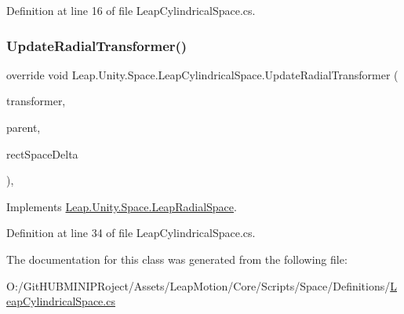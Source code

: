 Definition at line 16 of file Leap\+Cylindrical\+Space.\+cs.

\mbox{\label{class_leap_1_1_unity_1_1_space_1_1_leap_cylindrical_space_aaf93c86d6ae53e212049898f2bb2a2cf}} 
\subsubsection{\texorpdfstring{UpdateRadialTransformer()}{UpdateRadialTransformer()}}
{\footnotesize\ttfamily override void Leap.\+Unity.\+Space.\+Leap\+Cylindrical\+Space.\+Update\+Radial\+Transformer (\begin{DoxyParamCaption}\item[{\mbox{\hyperlink{interface_leap_1_1_unity_1_1_space_1_1_i_transformer}{I\+Transformer}}}]{transformer,  }\item[{\mbox{\hyperlink{interface_leap_1_1_unity_1_1_space_1_1_i_transformer}{I\+Transformer}}}]{parent,  }\item[{Vector3}]{rect\+Space\+Delta }\end{DoxyParamCaption})\hspace{0.3cm}{\ttfamily [protected]}, {\ttfamily [virtual]}}



Implements \mbox{\hyperlink{class_leap_1_1_unity_1_1_space_1_1_leap_radial_space_afc597bb7c75791b2f8807b3b810e8c69}{Leap.\+Unity.\+Space.\+Leap\+Radial\+Space}}.



Definition at line 34 of file Leap\+Cylindrical\+Space.\+cs.



The documentation for this class was generated from the following file\+:\begin{DoxyCompactItemize}
\item 
O\+:/\+Git\+H\+U\+B\+M\+I\+N\+I\+P\+Roject/\+Assets/\+Leap\+Motion/\+Core/\+Scripts/\+Space/\+Definitions/\mbox{\hyperlink{_leap_cylindrical_space_8cs}{Leap\+Cylindrical\+Space.\+cs}}\end{DoxyCompactItemize}

